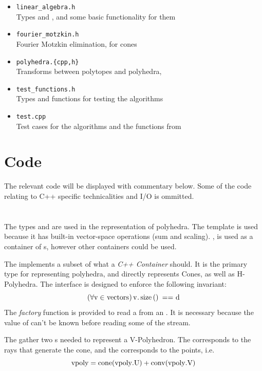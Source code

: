 \begin{itemize}
	\item \texttt{linear\_algebra.h} \\
	      Types  and , and some basic functionality for them
	\item \texttt{fourier\_motzkin.h} \\
	      Fourier Motzkin elimination, {\MWT} for cones
	\item \texttt{polyhedra.\{cpp,h\} } \\
	      Transforms between polytopes and polyhedra, {\MWT}
	\item \texttt{test\_functions.h} \\
	      Types and functions for testing the algorithms
	\item \texttt{test.cpp} \\
	      Test cases for the algorithms and the functions from 
\end{itemize}

\section{Code}

The relevant code will be displayed with commentary below.  Some of the code relating to C{++} specific technicalities and I/O is ommitted.

\section{}
The types  and  are used in the representation of polyhedra.  The  template is used because it has built-in vector-space operations (sum and scaling).  , is used as a container of s, however other containers could be used.
\lsttdVecs

The  implements a subset of what a \textit{C++ Container} should.  It is the primary type for representing polyhedra, and directly represents Cones, as well as H-Polyhedra.  The interface is designed to enforce the following invariant:
\[ (\forall \mli{v} \in \mli{vectors})\, \mli{v.size() == d} \]
The \textit{factory} function  is provided to read a  from an .  It is necessary because the value of  can't be known before reading some of the stream.
\lstMatrix

The  gather two s needed to represent a V-Polyhedron.  The  corresponds to the rays that generate the cone, and the  corresponds to the points, i.e.
\[ \mli{vpoly} = \cone(\mli{vpoly.U}) + \conv(\mli{vpoly.V}) \]
\lstVPoly

